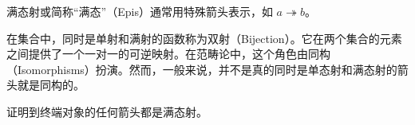 \documentclass[DaoFP]{subfiles}
\begin{document}
    满态射或简称“满态”（Epis）通常用特殊箭头表示，如 $a \twoheadrightarrow b$。

    在集合中，同时是单射和满射的函数称为双射（Bijection）。它在两个集合的元素之间提供了一个一对一的可逆映射。在范畴论中，这个角色由同构（Isomorphisms）扮演。然而，一般来说，并不是真的同时是单态射和满态射的箭头就是同构的。

    \begin{exercise}
        证明到终端对象的任何箭头都是满态射。
    \end{exercise}
\end{document}
